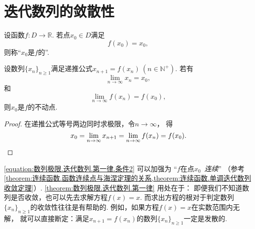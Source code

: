 \section{迭代数列的敛散性}
\begin{definition}\label{definition:迭代数列.不动点}
设函数\(f\colon D\to\mathbb{R}\).
若点\(x_0 \in D\)满足\begin{equation*}
	f(x_0) = x_0,
\end{equation*}
则称“\(x_0\)是\(f\)的”.
\end{definition}
\begin{proposition}\label{theorem:数列极限.迭代数列.第一律}
设数列\(\{x_n\}_{n\geq1}\)满足递推公式\(x_{n+1} = f(x_n)\ (n\in\mathbb{N}^+)\).
若有\begin{equation*}%
	\lim_{n\to\infty} x_n = x_0,
\end{equation*}和\begin{equation}\label{equation:数列极限.迭代数列.第一律.条件2}
	\lim_{n\to\infty} f(x_n) = f(x_0),
\end{equation}
则\(x_0\)是\(f\)的不动点.
\begin{proof}
在递推公式等号两边同时求极限，令\(n\to\infty\)，
得\begin{equation*}
	x_0 = \lim_{n\to\infty} x_{n+1} = \lim_{n\to\infty} f(x_n) = f(x_0).
	\qedhere
\end{equation*}
\end{proof}
\end{proposition}
\begin{remark}
\cref{equation:数列极限.迭代数列.第一律.条件2} 可以加强为
“\(f\)在点\(x_0\)~\emph{连续}”
（参考\cref{theorem:连续函数.函数连续点与海涅定理的关系,theorem:连续函数.单调迭代数列收敛定理}）.
\cref{theorem:数列极限.迭代数列.第一律} 用处在于：
即便我们不知道数列是否收敛，也可以先去求解方程\(f(x) = x\).
而求出方程的根对于判定数列\(\{x_n\}_{n\geq1}\)的收敛性往往是有帮助的.
例如，如果方程\(f(x) = x\)在实数范围内无解，
就可以直接断定：满足\(x_{n+1} = f(x_n)\)的数列\(\{x_n\}_{n\geq1}\)一定是发散的.
\end{remark}
